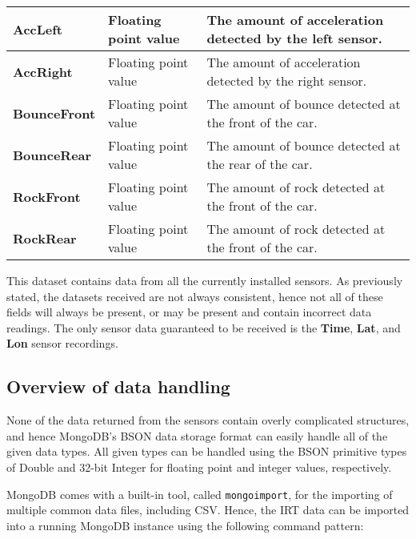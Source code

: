 \documentclass[a4paper,11pt]{article}
\begin{document}
\begin{table}[h]
{\begin{tabular}{ | l | l | l | }
\textbf{AccLeft}        & Floating point value                   & The amount of acceleration detected by the left sensor.  \\ \hline
\textbf{AccRight}       & Floating point value                   & The amount of acceleration detected by the right sensor.  \\ \hline
\textbf{BounceFront}    & Floating point value                   & The amount of bounce detected at the front of the car.  \\ \hline
\textbf{BounceRear}     & Floating point value                   & The amount of bounce detected at the rear of the car.  \\ \hline
\textbf{RockFront}      & Floating point value                   & The amount of rock detected at the front of the car.  \\ \hline
\textbf{RockRear}       & Floating point value                   & The amount of rock detected at the front of the car.  \\ \hline

\end{tabular}}
\end{table}

This dataset contains data from all the currently installed sensors. As previously stated, the datasets received are not always
consistent, hence not all of these fields will always be present, or may be present and contain incorrect data readings.
The only sensor data guaranteed to be received is the \textbf{Time}, \textbf{Lat}, and \textbf{Lon} sensor recordings.



\subsection{Overview of data handling} %
\label{sub:overview_of_data_handling}

None of the data returned from the sensors contain overly complicated structures, and hence MongoDB's BSON data storage
format can easily handle all of the given data types. All given types can be handled using the BSON primitive types of
Double and 32-bit Integer for floating point and integer values, respectively.

MongoDB comes with a built-in tool, called \texttt{mongoimport}, for the importing of multiple common data files, including
CSV. Hence, the IRT data can be imported into a running MongoDB instance using the following command pattern:
\end{document}
